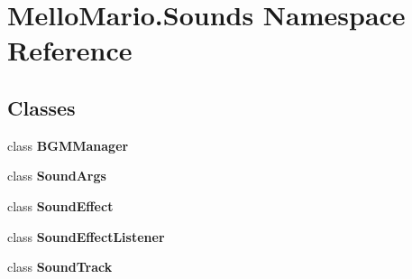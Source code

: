 \section{Mello\+Mario.\+Sounds Namespace Reference}
\label{namespaceMelloMario_1_1Sounds}
\subsection*{Classes}
\begin{DoxyCompactItemize}
\item 
class \textbf{ B\+G\+M\+Manager}
\item 
class \textbf{ Sound\+Args}
\item 
class \textbf{ Sound\+Effect}
\item 
class \textbf{ Sound\+Effect\+Listener}
\item 
class \textbf{ Sound\+Track}
\end{DoxyCompactItemize}
